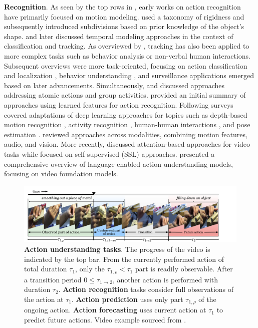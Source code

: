 \noindent
\textbf{Recognition}. As seen by the top rows in  , early works on action recognition have primarily focused on motion modeling.  used a taxonomy of rigidness and subsequently  introduced subdivisions based on prior knowledge of the object's shape.  and later  discussed temporal modeling approaches in the context of classification and tracking. As overviewed by , tracking has also been applied to more complex tasks such as behavior analysis or non-verbal human interactions. 
Subsequent overviews were more task-oriented, focusing on action classification and localization , behavior understanding , and surveillance applications  emerged based on later advancements. Simultaneously,  and  discussed approaches addressing atomic actions and group activities.  provided an initial summary of approaches using learned features for action recognition. Following surveys covered adaptations of deep learning approaches for topics such as depth-based motion recognition , activity recognition , human-human interactions , and pose estimation .  reviewed approaches across modalities, combining motion features, audio, and vision. More recently,  discussed attention-based approaches for video tasks while  focused on self-supervised (SSL) approaches.  presented a comprehensive overview of language-enabled action understanding models, focusing on video foundation models.

\begin{figure}[t]
    \centering
    \includegraphics[width=\linewidth,trim={1cm 0 6cm 0},clip]{figs/action_understanding_tasks.pdf}
    \caption{\textbf{Action understanding tasks}. The progress of the video is indicated by the top bar. From the currently performed action of total duration $\tau_1$, only the $\tau_{1,\rho}<\tau_1 $ part is readily observable. After a transition period $0\leq\tau_{1 \rightarrow 2}$, another action is performed with duration $\tau_2$. \textbf{Action recognition} tasks consider full observations of the action at $\tau_1$. \textbf{Action prediction} uses only part $\tau_{1,\rho}$ of the ongoing action. \textbf{Action forecasting} uses current action at $\tau_1$ to predict future actions. Video example sourced from .} 
    \label{fig:tasks}
\end{figure}

